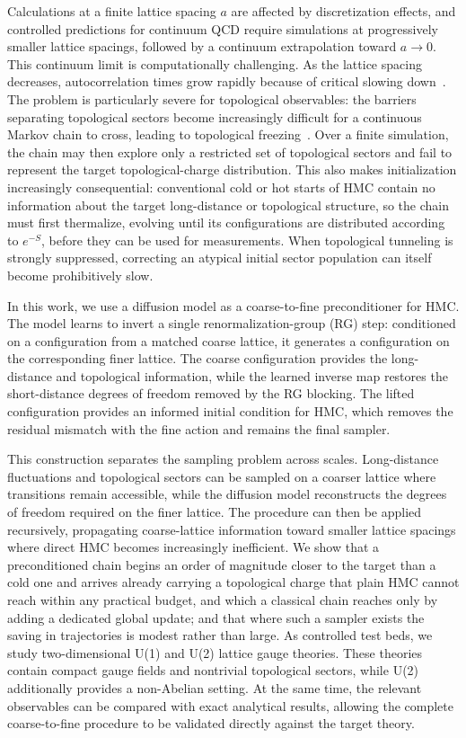 \documentclass[prd, twocolumn, superscriptaddress, nofootinbib,floatfix]{revtex4-2}
\begin{document}
Calculations at a finite lattice spacing $a$ are affected by discretization effects, and controlled predictions for continuum QCD require simulations at progressively smaller lattice spacings, followed by a continuum extrapolation toward $a\to0$. This continuum limit is computationally challenging. As the lattice spacing decreases, autocorrelation times grow rapidly because of critical slowing down~\cite{schaefer2011}. The problem is particularly severe for topological observables: the barriers separating topological sectors become increasingly difficult for a continuous Markov chain to cross, leading to topological freezing~\cite{luscher2011}. Over a finite simulation, the chain may then explore only a restricted set of topological sectors and fail to represent the target topological-charge distribution. This also makes initialization increasingly consequential: conventional cold or hot starts of HMC contain no information about the target long-distance or topological structure, so the chain must first thermalize, evolving until its configurations are
distributed according to $e^{-S}$, before they can be used for measurements. When topological tunneling is strongly suppressed, correcting an atypical initial sector population can itself become prohibitively
slow.

In this work, we use a diffusion model as a coarse-to-fine preconditioner for HMC. The model learns to invert a single renormalization-group (RG) step: conditioned on a configuration from a matched coarse lattice, it generates a configuration on the corresponding finer lattice. The coarse configuration provides the long-distance and topological information, while the learned
inverse map restores the short-distance degrees of freedom removed by the RG blocking. The lifted configuration provides an informed initial condition for HMC, which removes the residual mismatch with the fine action and remains the final sampler.

This construction separates the sampling problem across scales. Long-distance fluctuations and topological sectors can be sampled on a coarser lattice where transitions remain accessible, while the diffusion model reconstructs the degrees of freedom required on the finer lattice. The procedure can then be applied recursively, propagating coarse-lattice information toward smaller
lattice spacings where direct HMC becomes increasingly inefficient. We show that
a preconditioned chain begins an order of magnitude closer to the target than a
cold one and arrives already carrying a topological charge that plain HMC cannot
reach within any practical budget, and which a classical chain reaches only by
adding a dedicated global update; and that where such a sampler exists the
saving in trajectories is modest rather than large. As controlled test beds, we study two-dimensional U(1) and U(2) lattice gauge theories. These theories contain compact gauge fields and nontrivial
topological sectors, while U(2) additionally provides a non-Abelian setting.
At the same time, the relevant observables can be compared with exact
analytical results, allowing the complete coarse-to-fine procedure to be
validated directly against the target theory.
\end{document}
